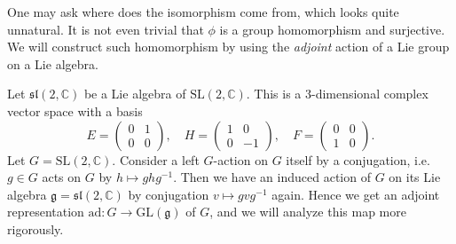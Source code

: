 \documentclass{article}
\newcommand{\SL}{\mathrm{SL}}
\newcommand{\ad}{\mathrm{ad}}
\begin{document}
One may ask where does the isomorphism come from, which looks quite unnatural. 
It is not even trivial that $\phi$ is a group homomorphism and surjective. 
We will construct such homomorphism by using the \emph{adjoint} action of a Lie group on a Lie algebra. 

Let $\mathfrak{sl}(2, \mathbb{C})$ be a Lie algebra of $\SL(2, \mathbb{C})$. 
This is a 3-dimensional complex vector space with a basis 
$$
E = \begin{pmatrix} 0&1\\0&0\end{pmatrix}, \quad H = \begin{pmatrix} 1&0\\0&-1\end{pmatrix}, \quad F = \begin{pmatrix} 0&0 \\ 1&0 \end{pmatrix}.
$$
Let $G = \SL(2, \mathbb{C})$. Consider a left $G$-action on $G$ itself by a conjugation, i.e. $g\in G$ acts on $G$ by $h\mapsto ghg^{-1}$. 
Then we have an induced action of $G$ on its Lie algebra $\mathfrak{g} = \mathfrak{sl}(2, \mathbb{C})$ by conjugation $v\mapsto gvg^{-1}$ again. 
Hence we get an adjoint representation $\ad:G\to \mathrm{GL}(\mathfrak{g})$ of $G$, and we will analyze this map more rigorously. 
\end{document}

